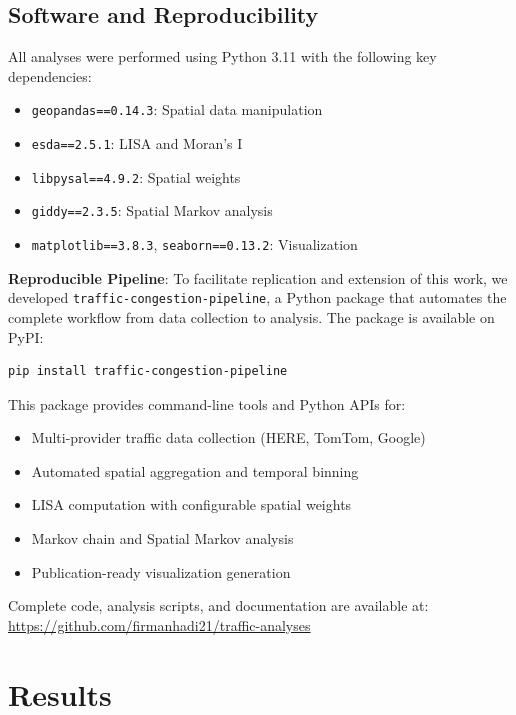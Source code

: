 \documentclass[11pt,a4paper]{article}
\begin{document}
\subsection{Software and Reproducibility}

All analyses were performed using Python 3.11 with the following key dependencies:

\begin{itemize}
    \item \texttt{geopandas==0.14.3}: Spatial data manipulation
    \item \texttt{esda==2.5.1}: LISA and Moran's I
    \item \texttt{libpysal==4.9.2}: Spatial weights
    \item \texttt{giddy==2.3.5}: Spatial Markov analysis
    \item \texttt{matplotlib==3.8.3}, \texttt{seaborn==0.13.2}: Visualization
\end{itemize}

\textbf{Reproducible Pipeline}: To facilitate replication and extension of this work, we developed \texttt{traffic-congestion-pipeline}, a Python package that automates the complete workflow from data collection to analysis. The package is available on PyPI:

\begin{lstlisting}[language=bash]
pip install traffic-congestion-pipeline
\end{lstlisting}

This package provides command-line tools and Python APIs for:
\begin{itemize}
    \item Multi-provider traffic data collection (HERE, TomTom, Google)
    \item Automated spatial aggregation and temporal binning
    \item LISA computation with configurable spatial weights
    \item Markov chain and Spatial Markov analysis
    \item Publication-ready visualization generation
\end{itemize}

Complete code, analysis scripts, and documentation are available at: \url{https://github.com/firmanhadi21/traffic-analyses}

\section{Results}
\end{document}
